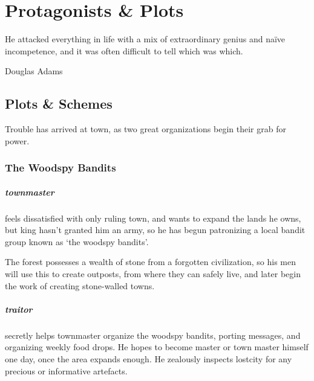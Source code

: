 \chapter{Protagonists \& Plots}
  \epigraph{He attacked everything in life with a mix of extraordinary genius and na\"ive incompetence, and it was often difficult to tell which was which.}{Douglas Adams}
\label{sideQuestIntro}

\label{Irina/greylands}

\section{Plots \& Schemes}

\begin{multicols}{2}


\noindent
Trouble has arrived at \gls{town}, as two great organizations begin their grab for power.

\subsection{The Woodspy Bandits}

\paragraph{\gls{townmaster}} feels dissatisfied with only ruling \gls{town}, and wants to expand the lands he owns, but \gls{king} hasn't granted him an army, so he has begun patronizing a local bandit group known as `the woodspy bandits'.

The forest possesses a wealth of stone from a forgotten civilization, so his men will use this to create outposts, from where they can safely live, and later begin the work of creating stone-walled towns.

\paragraph{\gls{traitor}}
secretly helps \gls{townmaster} organize the woodspy bandits, porting messages, and organizing weekly food drops.
He hopes to become  master or town master himself one day, once the area expands enough.
He zealously inspects \gls{lostcity} for any precious or informative artefacts.


\end{multicols}
